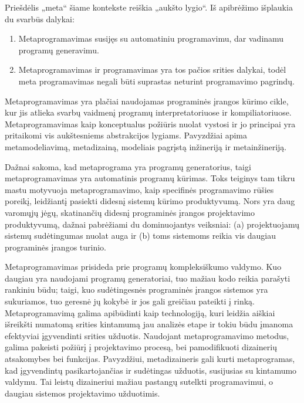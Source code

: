 \documentclass{VUMIFPSkursinis}
\begin{document}
Priešdėlis „meta“ šiame kontekste reiškia „aukšto lygio“. Iš apibrėžimo išplaukia du svarbūs dalykai:
\begin{enumerate}
\item Metaprogramavimas susijęs su automatiniu programavimu, dar vadinamu programų generavimu.
\item Metaprogramavimas ir programavimas yra tos pačios srities dalykai, todėl meta programavimas negali būti suprastas neturint programavimo pagrindų.
\end{enumerate}

Metaprogramavimas yra plačiai naudojamas programinės įrangos kūrimo cikle, kur jis atlieka svarbų vaidmenį programų interpretatoriuose ir kompiliatoriuose. Metaprogramavimas kaip konceptualus požiūris nuolat vystosi ir jo principai yra pritaikomi vis aukštesniems abstrakcijos lygiams. Pavyzdžiai apima metamodeliavimą, metadizainą, modeliais pagrįstą inžineriją ir metainžineriją.

Dažnai sakoma, kad metaprograma yra programų generatorius, taigi metaprogramavimas yra automatinis programų kūrimas. Toks teiginys tam tikru mastu motyvuoja metaprogramavimo, kaip specifinės programavimo rūšies poreikį, leidžiantį pasiekti didesnį sistemų kūrimo produktyvumą. Nors yra daug varomųjų jėgų, skatinančių didesnį programinės įrangos projektavimo produktyvumą, dažnai pabrėžiami du dominuojantys veiksniai: (a) projektuojamų sistemų sudėtingumas nuolat auga ir (b) toms sistemoms reikia vis daugiau programinės įrangos turinio.

Metaprogramavimas prisideda prie programų kompleksiškumo valdymo. Kuo daugiau yra naudojami programų generatoriai, tuo mažiau kodo reikia parašyti rankiniu būdu; taigi, kuo sudėtingesnės programinės įrangos sistemos yra sukuriamos, tuo geresnė jų kokybė ir jos gali greičiau pateikti į rinką. Metaprogramavimą galima apibūdinti kaip technologiją, kuri leidžia aiškiai išreikšti numatomą srities kintamumą jau analizės etape ir tokiu būdu įmanoma efektyviai įgyvendinti srities užduotis. Naudojant metaprogramavimo metodus, galima pakeisti požiūrį į projektavimo procesą, bei pamodifikuoti dizainerių atsakomybes bei funkcijas. Pavyzdžiui, metadizaineris gali kurti metaprogramas, kad įgyvendintų pasikartojančias ir sudėtingas užduotis, susijusias su kintamumo valdymu. Tai leistų dizaineriui mažiau pastangų sutelkti programavimui, o daugiau sistemos projektavimo užduotimis.
\cite{štuikys2012meta}
\end{document}
